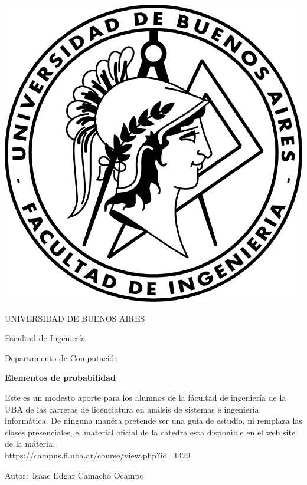 \documentclass[12pt]{book}
\begin{document}
\thispagestyle{empty}

\begin {center}

\includegraphics[scale=.4]{Logo-fiuba_big.png}

\medskip
UNIVERSIDAD DE BUENOS AIRES

Facultad de Ingenier\'ia

Departamento de Computaci\'on


\vspace{3cm}


\textbf{\large Elementos de probabilidad}

\vspace{2cm}


Este es un modesto aporte para los alumnos de la f\'acultad de ingenier\'ia  de la UBA de las carreras de licenciatura en an\'alsis de sistemas e ingenier\'ia inform\'atica.
De ninguna man\'era pretende ser una gu\'ia de estudio, ni remplaza las clases presenciales, el material oficial de la catedra esta disponible en el web site de la m\'ateria.
\\
https://campus.fi.uba.ar/course/view.php?id=1429
\end {center}


\vspace{2.5cm}

\noindent Autor:\,	Isaac Edgar Camacho Ocampo
 
\end{document}
